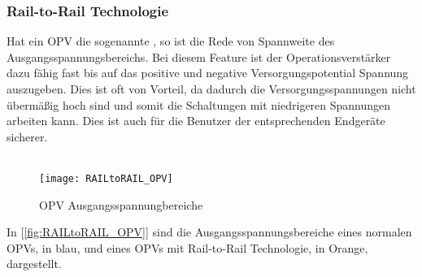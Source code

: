 \documentclass[titlepage,12pt,twoside]{article}
\begin{document}
\subsubsection{Rail-to-Rail Technologie}
Hat ein OPV die sogenannte , so ist die Rede von Spannweite des Ausgangsspannungsbereichs. Bei diesem Feature
ist der Operationsverstärker dazu fähig fast bis auf das positive und negative Versorgungspotential Spannung auszugeben. Dies ist oft 
von Vorteil, da dadurch die Versorgungsspannungen nicht übermäßig hoch sind und somit die Schaltungen mit niedrigeren Spannungen arbeiten
kann. Dies ist auch für die Benutzer der entsprechenden Endgeräte sicherer.\\
\\
\begin{figure}[H]
	\begin{center}
		\scalebox{0.5}
		{\texttt{[image: RAILtoRAIL\_OPV]}}
		\caption{OPV Ausgangsspannungbereiche}
		\label{fig:RAILtoRAIL_OPV}
	\end{center}
\end{figure}
\hfill \break
In [\textcolor{blue}{\autoref{fig:RAILtoRAIL_OPV}}] sind die Ausgangsspannungsbereiche eines normalen OPVs, in blau, und eines OPVs mit Rail-to-Rail Technologie,
in Orange, dargestellt. \\
\end{document}
